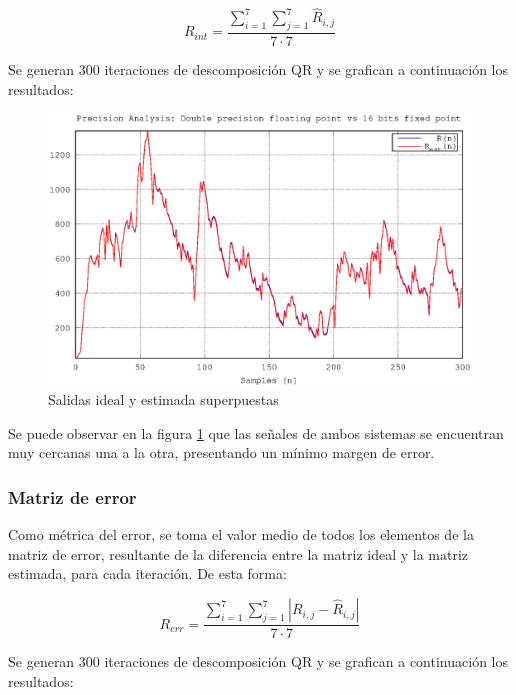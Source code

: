 \begin{equation}
    R_{int} = \frac{\sum_{i=1}^{7}\sum_{j=1}^{7} \hat{R}_{i,j}}{7 \cdot 7}
\end{equation}

Se generan 300 iteraciones de descomposición QR y se grafican a continuación los resultados:

\begin{figure}[h!]
    \centering
        \includegraphics[width = 12 cm]{./figures/C05-precision_1}
        \caption{Salidas ideal y estimada superpuestas}
        \label{fig:precision_1}
\end{figure}

Se puede observar en la figura \ref{fig:precision_1} que las señales de ambos sistemas se encuentran muy cercanas una a la otra, presentando un mínimo margen de error.

\subsubsection{Matriz de error}

Como métrica del error, se toma el valor medio de todos los elementos de la matriz de error, resultante de la diferencia entre la matriz ideal y la matriz estimada, para cada iteración. De esta forma:

\begin{equation}
R_{err} = \frac{\sum_{i=1}^{7}\sum_{j=1}^{7} | R_{i,j} - \hat{R}_{i,j}|}{7 \cdot 7}
\end{equation}

Se generan 300 iteraciones de descomposición QR y se grafican a continuación los resultados:

